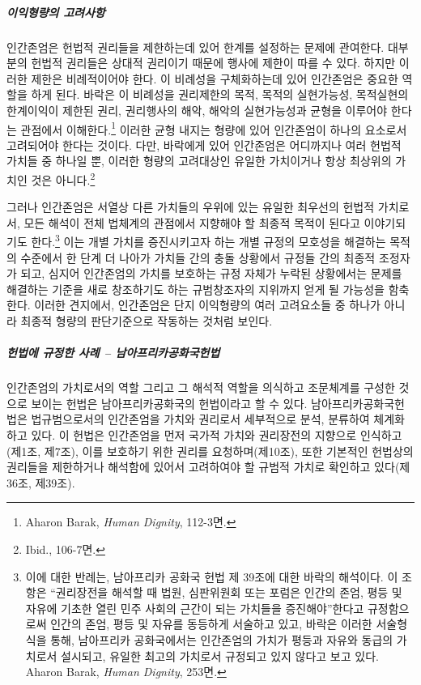 \subparagraph{이익형량의 고려사항}

인간존엄은 헌법적 권리들을 제한하는데 있어 한계를 설정하는 문제에 관여한다. 대부분의 헌법적 권리들은 상대적 권리이기 때문에 행사에 제한이 따를 수 있다. 하지만 이러한 제한은 비례적이어야 한다. 이 비례성을 구체화하는데 있어 인간존엄은 중요한 역할을 하게 된다. 바락은 이 비례성을 권리제한의 목적, 목적의 실현가능성, 목적실현의 한계이익이 제한된 권리, 권리행사의 해악, 해악의 실현가능성과 균형을 이루어야 한다는 관점에서 이해한다.\footnote{Aharon Barak, \emph{Human Dignity}, 112-3면.} 이러한 균형 내지는 형량에 있어 인간존엄이 하나의 요소로서 고려되어야 한다는 것이다. 다만, 바락에게 있어 인간존엄은 어디까지나 여러 헌법적 가치들 중 하나일 뿐, 이러한 형량의 고려대상인 유일한 가치이거나 항상 최상위의 가치인 것은 아니다.\footnote{Ibid., 106-7면.}

그러나 인간존엄은 서열상 다른 가치들의 우위에 있는 유일한 최우선의 헌법적 가치로서, 모든 해석이 전체 법체계의 관점에서 지향해야 할 최종적 목적이 된다고 이야기되기도 한다.\footnote{이에 대한 반례는, 남아프리카 공화국 헌법 제 39조에 대한 바락의 해석이다. 이 조항은 ``권리장전을 해석할 때 법원, 심판위원회 또는 포럼은 인간의 존엄, 평등 및 자유에 기초한 열린 민주 사회의 근간이 되는 가치들을 증진해야''한다고 규정함으로써 인간의 존엄, 평등 및 자유를 동등하게 서술하고 있고, 바락은 이러한 서술형식을 통해, 남아프리카 공화국에서는 인간존엄의 가치가 평등과 자유와 동급의 가치로서 설시되고, 유일한 최고의 가치로서 규정되고 있지 않다고 보고 있다. Aharon Barak, \emph{Human Dignity}, 253면.} 이는 개별 가치를 증진시키고자 하는 개별 규정의 모호성을 해결하는 목적의 수준에서 한 단계 더 나아가 가치들 간의 충돌 상황에서 규정들 간의 최종적 조정자가 되고, 심지어 인간존엄의 가치를 보호하는 규정 자체가 누락된 상황에서는 문제를 해결하는 기준을 새로 창조하기도 하는 규범창조자의 지위까지 얻게 될 가능성을 함축한다. 이러한 견지에서, 인간존엄은 단지 이익형량의 여러 고려요소들 중 하나가 아니라 최종적 형량의 판단기준으로 작동하는 것처럼 보인다.

\subparagraph{헌법에 규정한 사례 -- 남아프리카공화국헌법}

인간존엄의 가치로서의 역할 그리고 그 해석적 역할을 의식하고 조문체계를 구성한 것으로 보이는 헌법은 남아프리카공화국의 헌법이라고 할 수 있다. 남아프리카공화국헌법은 법규범으로서의 인간존엄을 가치와 권리로서 세부적으로 분석, 분류하여 체계화하고 있다. 이 헌법은 인간존엄을 먼저 국가적 가치와 권리장전의 지향으로 인식하고(제1조, 제7조), 이를 보호하기 위한 권리를 요청하며(제10조), 또한 기본적인 헌법상의 권리들을 제한하거나 해석함에 있어서 고려하여야 할 규범적 가치로 확인하고 있다(제36조, 제39조).

